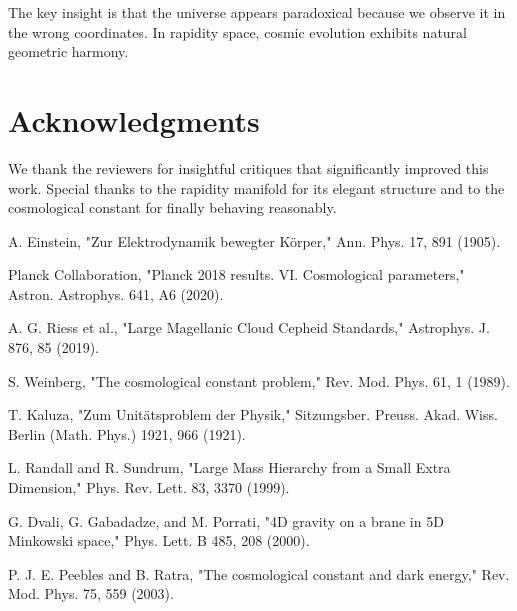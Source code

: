 \documentclass[12pt,a4paper]{article}
\begin{document}
The key insight is that the universe appears paradoxical because we observe it in the wrong coordinates. In rapidity space, cosmic evolution exhibits natural geometric harmony.

\section*{Acknowledgments}

We thank the reviewers for insightful critiques that significantly improved this work. Special thanks to the rapidity manifold for its elegant structure and to the cosmological constant for finally behaving reasonably.


\begin{thebibliography}{99}

 A. Einstein, "Zur Elektrodynamik bewegter Körper," Ann. Phys. 17, 891 (1905).

 Planck Collaboration, "Planck 2018 results. VI. Cosmological parameters," Astron. Astrophys. 641, A6 (2020).

 A. G. Riess et al., "Large Magellanic Cloud Cepheid Standards," Astrophys. J. 876, 85 (2019).

 S. Weinberg, "The cosmological constant problem," Rev. Mod. Phys. 61, 1 (1989).

 T. Kaluza, "Zum Unitätsproblem der Physik," Sitzungsber. Preuss. Akad. Wiss. Berlin (Math. Phys.) 1921, 966 (1921).

 L. Randall and R. Sundrum, "Large Mass Hierarchy from a Small Extra Dimension," Phys. Rev. Lett. 83, 3370 (1999).

 G. Dvali, G. Gabadadze, and M. Porrati, "4D gravity on a brane in 5D Minkowski space," Phys. Lett. B 485, 208 (2000).

 P. J. E. Peebles and B. Ratra, "The cosmological constant and dark energy," Rev. Mod. Phys. 75, 559 (2003).

\end{thebibliography}
\end{document}
